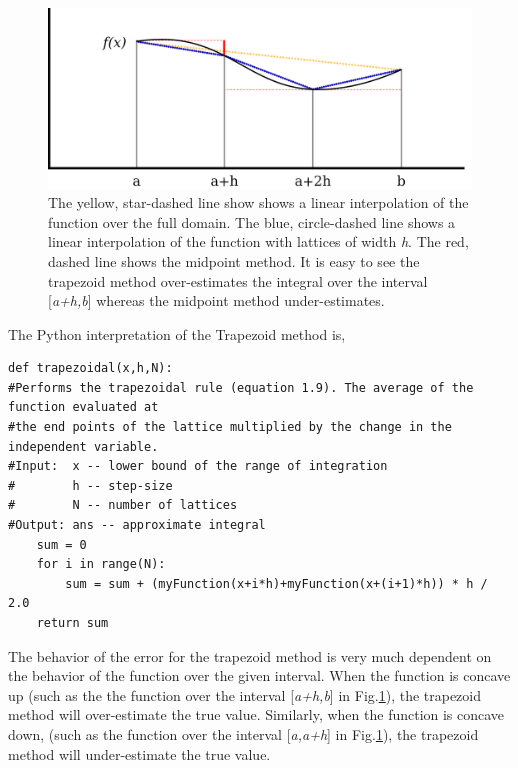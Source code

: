 \documentclass[10pt]{article}
\begin{document}
\begin{figure}[!ht]
    \begin{center}
	\includegraphics[width=\columnwidth]{interpolation.png}
	\caption{The yellow, star-dashed line show shows a linear interpolation of the function over the full domain. The blue, circle-dashed line shows a linear interpolation of the function with lattices of width \textit{h}. The red, dashed line shows the midpoint method. It is easy to see the trapezoid method over-estimates the integral over the interval [\textit{a+h,b}] whereas the midpoint method under-estimates.}
	\label{fig:interpolation}
	\end{center}
\end{figure}
    
The Python interpretation of the Trapezoid method is,
\begin{lstlisting}
def trapezoidal(x,h,N):
#Performs the trapezoidal rule (equation 1.9). The average of the function evaluated at
#the end points of the lattice multiplied by the change in the independent variable.
#Input:  x -- lower bound of the range of integration
#        h -- step-size
#        N -- number of lattices
#Output: ans -- approximate integral    
    sum = 0
    for i in range(N):
        sum = sum + (myFunction(x+i*h)+myFunction(x+(i+1)*h)) * h / 2.0
    return sum 
\end{lstlisting}

The behavior of the error for the trapezoid method is very much dependent on the behavior of the function over the given interval. When the function is concave up (such as the the function over the interval [\textit{a+h,b}] in Fig.\ref{fig:interpolation}), the trapezoid method will over-estimate the true value. Similarly, when the function is concave down, (such as the function over the interval [\textit{a,a+h}] in Fig.\ref{fig:interpolation}), the trapezoid method will under-estimate the true value. 
\end{document}

